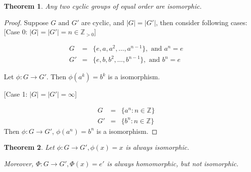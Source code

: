 \documentclass{article}
\theoremstyle{MyNonumberplain}
\theoremstyle{break}
\newtheorem*{proof}{Proof. }
\newcommand{\p}{\phi}
\newcommand{\infixand}{\text{ and }}
\theoremstyle{break}
\newtheorem{theorem}{Theorem}[section]
\theoremstyle{break}
\theoremstyle{definition}
\theoremstyle{break}
\begin{document}
\begin{thmbox}
    \begin{theorem}
        Any two cyclic groups of equal order are isomorphic. 
    \end{theorem}
    \begin{prfbox}
        \begin{proof}
            Suppose $G \infixand G'$ are cyclic, and $| G | = | G' |$, then consider
            following cases:\\
            
                [Case 0: $| G | = | G' | = n \in \mathbb{Z}_{> 0}$]

            \begin{eqnarray*}
                G & = & \{ e, a, a^2, \ldots, a^{n - 1} \}, \infixand a^n = e\\
                G' & = & \{ e, b, b^2, \ldots, b^{n - 1} \}, \infixand b^n = e
            \end{eqnarray*}

            Let $\p : G \rightarrow G'$. Then $\p (a^k) = b^k$ is a isomorphism.\bigskip
            

                [Case 1: $| G | = | G' | = \infty$]

            \begin{eqnarray*}
            G & = & \{ a^n : n \in \mathbb{Z} \}\\
            G' & = & \{ b^n : n \in \mathbb{Z} \}
            \end{eqnarray*}
            Then $\p : G \rightarrow G'$, $\p (a^n) = b^n$ is a isomorphism.
        \end{proof}
    \end{prfbox}
\end{thmbox}

\begin{thmbox}
    \begin{theorem}
        Let $\p : G \rightarrow G', \p (x) = x$ is always isomorphic.\bigskip

        Moreover, $\Phi : G \rightarrow G', \Phi (x) = e'$ is always homomorphic, but
        not isomorphic.
    \end{theorem}

\end{thmbox}
\end{document}
